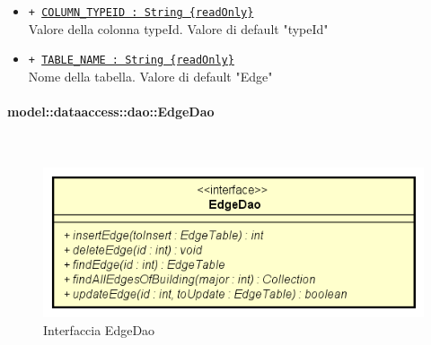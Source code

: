 \documentclass[../DefinizioneDiProdotto.tex]{subfiles}
\begin{document}
\begin{description}
\begin{itemize}
		\item \texttt{+ \underline{COLUMN\_TYPEID : String \{readOnly\}}}\\
		Valore della colonna typeId. Valore di default "typeId"
		
		\item \texttt{+ \underline{TABLE\_NAME : String \{readOnly\}}}\\
		Nome della tabella. Valore di default "Edge"
		
	\end{itemize}
\end{description}

\paragraph{model::dataaccess::dao::EdgeDao}
\
\begin{figure}[H]
	\centering
	\includegraphics[width=\maxwidth]{img/EdgeDao.png}
	\caption{Interfaccia EdgeDao}\label{fig:model::dataaccess::dao::EdgeDao} 
\end{figure}
\end{document}
